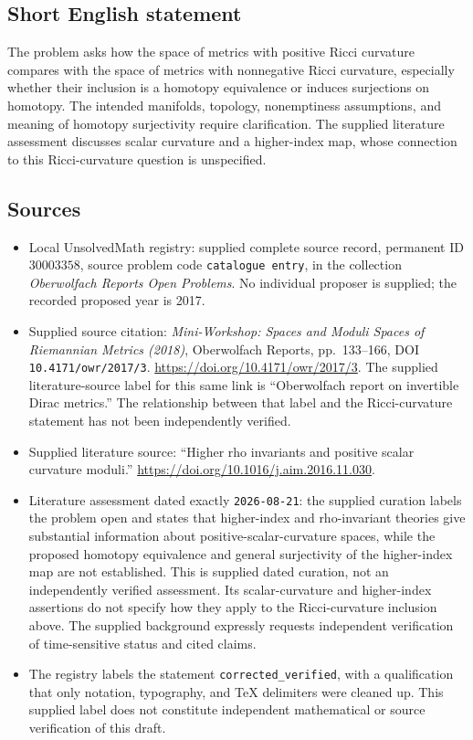 \documentclass[11pt]{article}
\begin{document}
\subsection{Short English statement}
The problem asks how the space of metrics with positive Ricci curvature compares with the space of metrics with nonnegative Ricci curvature, especially whether their inclusion is a homotopy equivalence or induces surjections on homotopy. The intended manifolds, topology, nonemptiness assumptions, and meaning of homotopy surjectivity require clarification. The supplied literature assessment discusses scalar curvature and a higher-index map, whose connection to this Ricci-curvature question is unspecified.
\subsection{Sources}
\begin{itemize}
\item Local UnsolvedMath registry: supplied complete source record, permanent ID \(30003358\), source problem code \texttt{catalogue entry}, in the collection \emph{Oberwolfach Reports Open Problems}. No individual proposer is supplied; the recorded proposed year is 2017.
\item Supplied source citation: \emph{Mini-Workshop: Spaces and Moduli Spaces of Riemannian Metrics (2018)}, Oberwolfach Reports, pp.~133--166, DOI \texttt{10.4171/owr/2017/3}. \url{https://doi.org/10.4171/owr/2017/3}. The supplied literature-source label for this same link is ``Oberwolfach report on invertible Dirac metrics.'' The relationship between that label and the Ricci-curvature statement has not been independently verified.
\item Supplied literature source: ``Higher rho invariants and positive scalar curvature moduli.'' \url{https://doi.org/10.1016/j.aim.2016.11.030}.
\item Literature assessment dated exactly \texttt{2026-08-21}: the supplied curation labels the problem open and states that higher-index and rho-invariant theories give substantial information about positive-scalar-curvature spaces, while the proposed homotopy equivalence and general surjectivity of the higher-index map are not established. This is supplied dated curation, not an independently verified assessment. Its scalar-curvature and higher-index assertions do not specify how they apply to the Ricci-curvature inclusion above. The supplied background expressly requests independent verification of time-sensitive status and cited claims.
\item The registry labels the statement \texttt{corrected\_verified}, with a qualification that only notation, typography, and TeX delimiters were cleaned up. This supplied label does not constitute independent mathematical or source verification of this draft.
\end{itemize}
\end{document}
